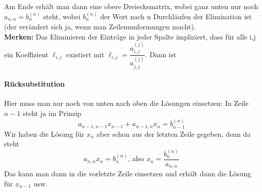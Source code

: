 			Am Ende erhält man dann eine obere Dreiecksmatrix, wobei ganz unten nur noch $ a_{n,n} = b_n^{(n)} $ steht, wobei $ b_n^{(n)} $ der Wert nach n Durchläufen der Elimination ist (der verändert sich ja, wenn man Zeilenumformungen macht).\\
			\textbf{Merken:} Das Eliminieren der Einträge in jeder Spalte impliziert, dass für alle i,j ein Koeffizient $ \ell_{i,j} $ existiert mit $ \ell_{i,j} = \dfrac{a_{i,j}^{(j)}}{a_{j,j}^{(j)}}  $. Dann ist $  $
			
			\paragraph{Rücksubstitution} Hier muss man nur noch von unten nach oben die Lösungen einsetzen: 
			In Zeile $ n-1 $ steht ja im Prinzip
			$$ a_{n-1,n-1}x_{n-1} + a_{n-1,n}x_n = b_{n-1}^{(n)} $$
			Wir haben die Lösung für $ x_n $ aber schon aus der letzten Zeile gegeben, denn da steht
			$$ a_{n,n}x_n = b_n^{(n)} \text{, also }  x_n = \frac{b_n^{(n)}}{a_{n,n}} $$
			Das kann man dann in die vorletzte Zeile einsetzen und erhält dann die Lösung für $ x_{n-1} $ usw.
			
			
			